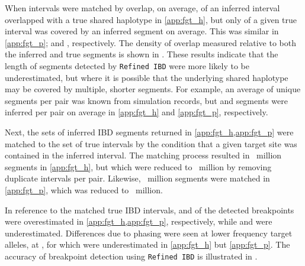 %

%


When intervals were matched by overlap, on average,  of an inferred interval overlapped with a true shared haplotype in \cref{app:fgt_h}, but only  of a given true interval was covered by an inferred segment on average.
This was similar in \ref{app:fgt_p};  and , respectively.
The density of overlap measured relative to both the inferred and true segments is shown in .
These results indicate that the length of segments detected by \texttt{Refined\,IBD} were more likely to be underestimated, but where it is possible that the underlying shared haplotype may be covered by multiple, shorter segments.
For example, an average of  unique segments per pair was known from simulation records, but  and  segments were inferred per pair on average in \ref{app:fgt_h} and \ref{app:fgt_p}, respectively.



Next, the sets of inferred IBD segments returned in \cref{app:fgt_h,app:fgt_p} were matched to the set of true intervals by the condition that a given target site was contained in the inferred interval.
The matching process resulted in ~million segments in \ref{app:fgt_h}, but which were reduced to ~million by removing duplicate intervals per pair.
Likewise, ~million segments were matched in \ref{app:fgt_p}, which was reduced to ~million.



%

%


In reference to the matched true IBD intervals,  and  of the detected breakpoints were overestimated in \cref{app:fgt_h,app:fgt_p}, respectively,
while  and  were underestimated.
Differences due to phasing were seen at lower frequency target alleles, \eg at , for which
 were underestimated in \ref{app:fgt_h} but  \ref{app:fgt_p}.
The accuracy of breakpoint detection using \texttt{Refined\,IBD} is illustrated in .


